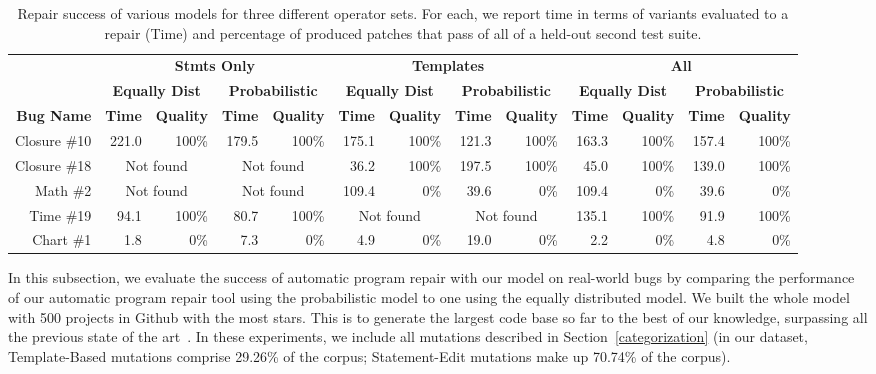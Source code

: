 \documentclass[conference]{IEEEtran}
\begin{document}
\begin{table}\centering
\begin{tabular}{r|rr|rr|rr|rr|rr|rr}
\toprule
  &\multicolumn{4}{c|}{\textbf{Stmts Only}} & \multicolumn{4}{c|}{\textbf{Templates}} & \multicolumn{4}{c}{\textbf{All}} \\  
  & \multicolumn{2}{c|}{\textbf{Equally Dist}} & \multicolumn{2}{c|}{\textbf{Probabilistic}} & \multicolumn{2}{c|}{\textbf{Equally Dist}} & \multicolumn{2}{c|}{\textbf{Probabilistic}} & \multicolumn{2}{c|}{\textbf{Equally Dist}} & 
\multicolumn{2}{c}{\textbf{Probabilistic}} \\

 \textbf{Bug Name} & \textbf{Time} & \textbf{Quality} &  \textbf{Time} & \textbf{Quality} &  \textbf{Time} & \textbf{Quality}&  \textbf{Time} & \textbf{Quality}&  \textbf{Time} & \textbf{Quality}&  \textbf{Time} & \textbf{Quality} \\\midrule

 Closure \#10 & {221.0}& {100\%} & {179.5} &{100\%} & {175.1}&{100\%} & {121.3}&{100\%} & {163.3}&{100\%} & {157.4}&{100\%} \\

 Closure \#18 & \multicolumn{2}{c|}{Not found} & \multicolumn{2}{c|}{Not found} & {36.2}&{100\%} & {197.5}&{100\%} & {45.0}&{100\%} & {139.0}&{100\%} \\

 Math \#2 & \multicolumn{2}{c|}{Not found} & \multicolumn{2}{c|}{Not found} & {109.4}&{0\%} & {39.6}&{0\%} & {109.4}&{0\%} & {39.6}&{0\%} \\

 Time \#19 & {94.1}&{100\%} & {80.7}&{100\%} & \multicolumn{2}{c|}{Not found} & \multicolumn{2}{c|}{Not found} & {135.1}&{100\%} & {91.9}&{100\%} \\

 Chart \#1 & {1.8}&{0\%} & {7.3}&{0\%} & {4.9}&{0\%} & {19.0}&{0\%} & {2.2}&{0\%} & {4.8}&{0\%} \\

\bottomrule

\end{tabular}
		\caption{Repair success of various models for three different operator
          sets.  For each, we report time in terms of variants evaluated to a
          repair (Time) and percentage of produced patches that pass of all of a
          held-out second test suite. \label{tab:singleLineBugs}}
\end{table}

In this subsection, we evaluate the success of automatic program repair with our
model on real-world bugs  by comparing the performance of our 
automatic program repair tool using the probabilistic model to one using the
equally distributed model.  
We built the whole model with 500
projects in Github with the most stars.
 This is to generate the largest code base so far to the best 
of our knowledge, surpassing all the previous state of the 
art~\cite{long16proph,Soto15,zhong15,martinez15,xuan16}. 
In these experiments, we include all mutations described in
Section~\ref{categorization} (in our dataset, Template-Based mutations comprise 29.26\% of the corpus; Statement-Edit mutations make up 70.74\% of the 
corpus).
\end{document}
